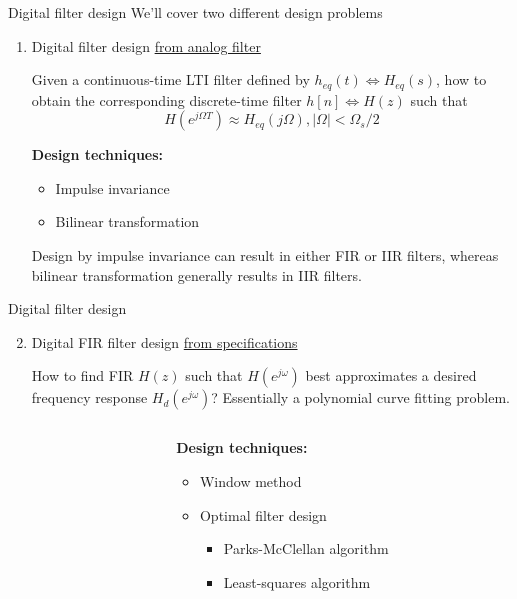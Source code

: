 \documentclass[10pt, aspectratio=169]{beamer}
\begin{document}
\begin{frame}{Digital filter design}
	We'll cover two different design problems
	\begin{enumerate}
		\item Digital filter design \underline{from analog filter}
		
		Given a continuous-time LTI filter defined by $h_{eq}(t) \Longleftrightarrow H_{eq}(s)$, how to obtain the corresponding discrete-time filter $h[n] \Longleftrightarrow H(z)$ such that
		\begin{equation*}
			H(e^{j\Omega T}) \approx H_{eq}(j\Omega), |\Omega| < \Omega_s/2
		\end{equation*}
		
		\textbf{Design techniques:}
		\begin{itemize}\normalsize
			\item Impulse invariance
			\item Bilinear transformation
		\end{itemize}
		Design by impulse invariance can result in either FIR or IIR filters, whereas bilinear transformation generally results in IIR filters. 
	\end{enumerate}
\end{frame}

%
\begin{frame}{Digital filter design}
\begin{enumerate}\setcounter{enumi}{1}
	\item Digital FIR filter design \underline{from specifications}
	
	How to find FIR $H(z)$ such that $H(e^{j\omega})$ best approximates a desired frequency response $H_d(e^{j\omega})$? Essentially a polynomial curve fitting problem.
	\begin{columns}
		\begin{column}{0.6\textwidth}
			\begin{center}
				\resizebox{\linewidth}{!}{}
			\end{center}
		\end{column}
		\begin{column}{0.4\textwidth}
			\textbf{Design techniques:}
			\begin{itemize}
				\item Window method
				\item Optimal filter design
				\begin{itemize}
					\item Parks-McClellan algorithm
					\item Least-squares algorithm
				\end{itemize}
			\end{itemize}
		\end{column}
	\end{columns}
\end{enumerate}
\end{frame}
\end{document}
